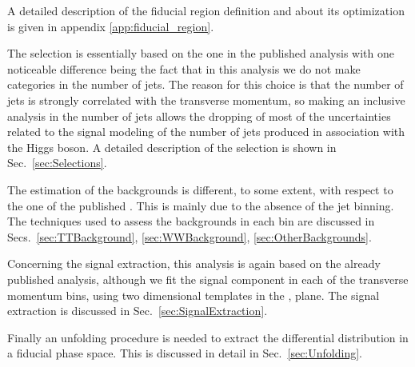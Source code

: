 A detailed description of the fiducial region definition and about its optimization is given in appendix \ref{app:fiducial_region}.

The selection is essentially based on the one in the \hwwllnn published analysis \cite{Chatrchyan:2013iaa} with one noticeable difference being the fact that in this analysis we do not make categories in the number of jets. The reason for this choice is that the number of jets is strongly correlated with the transverse momentum, so making an inclusive analysis in the number of jets allows the dropping of most of the uncertainties related to the signal modeling of the number of jets produced in association with the Higgs boson. A detailed description of the selection is shown in Sec.~\ref{sec:Selections}.

The estimation of the backgrounds is different, to some extent, with respect to the one of the published \hwwllnn. This is mainly due to the absence of the jet binning. The techniques used to assess the backgrounds in each bin are discussed in Secs.~\ref{sec:TTBackground}, \ref{sec:WWBackground}, \ref{sec:OtherBackgrounds}.

Concerning the signal extraction, this analysis is again based on the already published \hwwllnn analysis, although we fit the signal component in each of the transverse momentum bins, using two dimensional templates in the \mll, \mt plane. The signal extraction is discussed in Sec.~\ref{sec:SignalExtraction}. 

Finally an unfolding procedure is needed to extract the differential distribution in a fiducial phase space. This is discussed in detail in Sec.~\ref{sec:Unfolding}.

